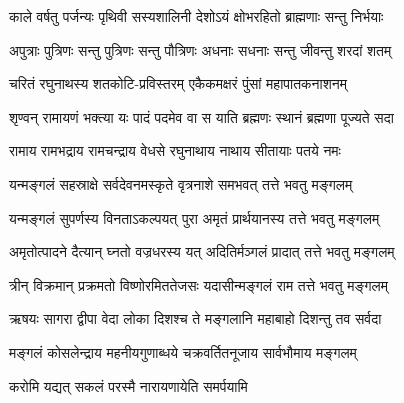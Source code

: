 \twolineshloka
{काले वर्षतु पर्जन्यः पृथिवी सस्यशालिनी}
{देशोऽयं क्षोभरहितो ब्राह्मणाः सन्तु निर्भयाः}

\twolineshloka
{अपुत्राः पुत्रिणः सन्तु पुत्रिणः सन्तु पौत्रिणः}
{अधनाः सधनाः सन्तु जीवन्तु शरदां शतम्}

\twolineshloka
{चरितं रघुनाथस्य शतकोटि-प्रविस्तरम्}
{एकैकमक्षरं पुंसां महापातकनाशनम्}

\twolineshloka
{शृण्वन् रामायणं भक्त्या यः पादं पदमेव वा}
{स याति ब्रह्मणः स्थानं ब्रह्मणा पूज्यते सदा}

\twolineshloka
{रामाय रामभद्राय रामचन्द्राय वेधसे}
{रघुनाथाय नाथाय सीतायाः पतये नमः}

\twolineshloka
{यन्मङ्गलं सहस्राक्षे सर्वदेवनमस्कृते}
{वृत्रनाशे समभवत् तत्ते भवतु मङ्गलम्}

\twolineshloka
{यन्मङ्गलं सुपर्णस्य विनताऽकल्पयत् पुरा}
{अमृतं प्रार्थयानस्य तत्ते भवतु मङ्गलम्}

\twolineshloka
{अमृतोत्पादने दैत्यान् घ्नतो वज्रधरस्य यत्}
{अदितिर्मञ्गलं प्रादात् तत्ते भवतु मङ्गलम्}

\twolineshloka
{त्रीन् विक्रमान् प्रक्रमतो विष्णोरमिततेजसः}
{यदासीन्मङ्गलं राम तत्ते भवतु मङ्गलम्}

\twolineshloka
{ऋषयः सागरा द्वीपा वेदा लोका दिशश्च ते}
{मङ्गलानि महाबाहो दिशन्तु तव सर्वदा}

\twolineshloka
{मङ्गलं कोसलेन्द्राय महनीयगुणाब्धये}
{चक्रवर्तितनूजाय सार्वभौमाय मङ्गलम्}

{करोमि यद्यत् सकलं परस्मै नारायणायेति समर्पयामि}
